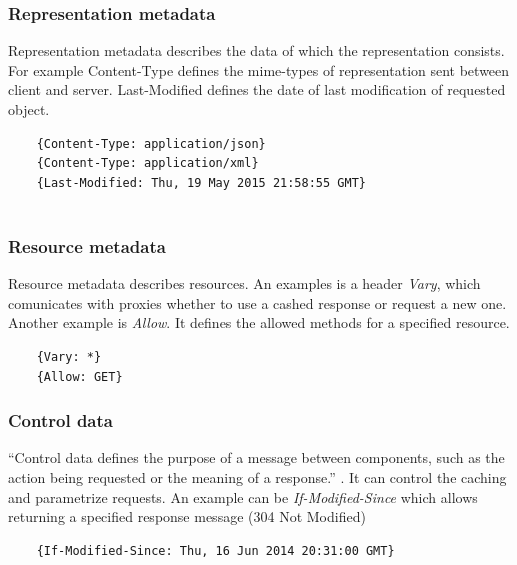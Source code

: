 \subsubsection{Representation metadata}
  Representation metadata describes the data of which the representation consists. For example Content-Type defines the \gls{mime-types} of representation sent between client and server. Last-Modified defines the date of last modification of requested object.

  \begin{center}
  \begin{lstlisting}
    {Content-Type: application/json}
    {Content-Type: application/xml}
    {Last-Modified: Thu, 19 May 2015 21:58:55 GMT}
    
  \end{lstlisting}
  \end{center}
  
\subsubsection{Resource metadata}
  Resource metadata describes resources. An examples is a header \emph{Vary}, which comunicates with proxies whether to use a cashed response or request a new one. Another example is \emph{Allow}. It defines the allowed methods for a specified resource.
  
  \begin{center}
  \begin{lstlisting}
    {Vary: *}
    {Allow: GET}
  \end{lstlisting}
  \end{center}
  
\subsubsection{Control data}
  ``Control data defines the purpose of a message between components, such as the action being requested or the meaning of a response.'' \cite{fielding}. It can control the caching and parametrize requests. An example can be \emph{If-Modified-Since} which allows returning a specified response message (304 Not Modified)
  
  \begin{center}
  \begin{lstlisting}
    {If-Modified-Since: Thu, 16 Jun 2014 20:31:00 GMT}
  \end{lstlisting}
  \end{center}
  
